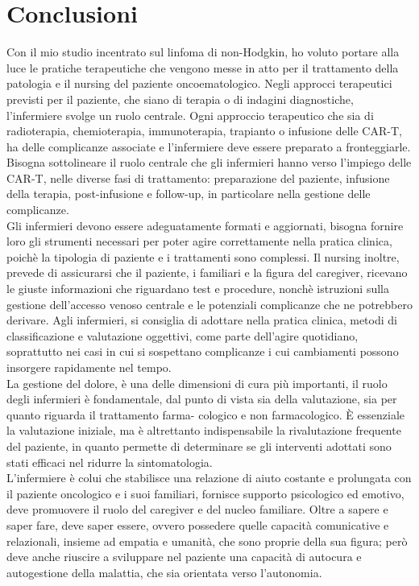 \chapter*{Conclusioni}

Con il mio studio incentrato sul linfoma di non-Hodgkin, ho voluto portare alla luce le pratiche terapeutiche 
che vengono messe in atto per il trattamento della patologia e il nursing del paziente oncoematologico. 
Negli approcci terapeutici previsti per il paziente, che siano di terapia o di indagini diagnostiche, l'infermiere 
svolge un ruolo centrale.
Ogni approccio terapeutico che sia di radioterapia, chemioterapia, immunoterapia, trapianto o infusione delle CAR-T, 
ha delle complicanze associate e l'infermiere deve essere preparato a fronteggiarle. 
Bisogna sottolineare il ruolo centrale che gli infermieri hanno verso l’impiego delle CAR-T, nelle diverse fasi 
di trattamento: preparazione del paziente, infusione della terapia, post-infusione e follow-up, in particolare nella 
gestione delle complicanze.\\
Gli infermieri devono essere adeguatamente formati e aggiornati, bisogna fornire loro gli strumenti necessari per poter 
agire correttamente nella pratica clinica, poichè la tipologia di paziente e i trattamenti sono complessi. 
Il nursing inoltre, prevede di assicurarsi che il paziente, i familiari e la figura del caregiver, ricevano le 
giuste informazioni che riguardano test e procedure, nonchè istruzioni sulla gestione dell’accesso venoso centrale e le
potenziali complicanze che ne potrebbero derivare.
Agli infermieri, si consiglia di adottare nella pratica clinica, metodi di classificazione e valutazione oggettivi, 
come parte dell’agire quotidiano, soprattutto nei casi in cui si sospettano complicanze i
cui cambiamenti possono insorgere rapidamente nel tempo.\\
La gestione del dolore, è una delle dimensioni di cura più importanti, il ruolo degli infermieri è
fondamentale, dal punto di vista sia della valutazione, sia per quanto riguarda il trattamento farma-
cologico e non farmacologico. 
È essenziale la valutazione iniziale, ma è altrettanto indispensabile la rivalutazione
frequente del paziente, in quanto permette di determinare se gli interventi adottati sono stati
efficaci nel ridurre la sintomatologia.\\
L’infermiere è colui che stabilisce una relazione di aiuto costante e prolungata con il paziente 
oncologico e i suoi familiari, fornisce supporto psicologico ed emotivo, deve promuovere il ruolo del
caregiver e del nucleo familiare. Oltre a sapere e saper fare, deve saper essere, ovvero possedere quelle 
capacità comunicative e relazionali, insieme ad empatia e umanità, che sono proprie della sua figura;
però deve anche riuscire a sviluppare nel paziente una capacità di autocura e autogestione della malattia, 
che sia orientata verso l’autonomia.

